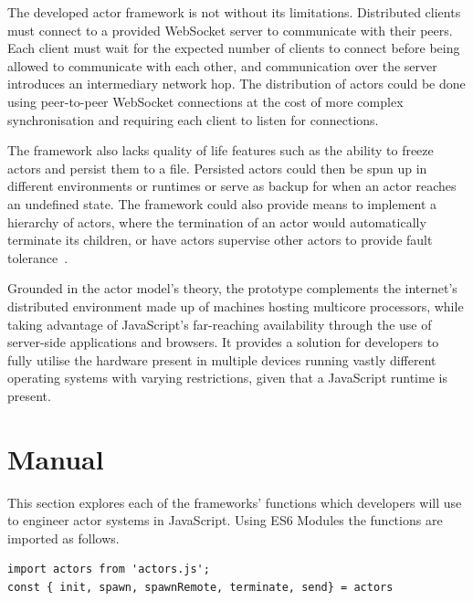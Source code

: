 \documentclass[oneside]{um-fict}
\begin{document}
The developed actor framework is not without its limitations. Distributed clients must connect to a provided WebSocket server to communicate with their peers. Each client must wait for the expected number of clients to connect before being allowed to communicate with each other, and communication over the server introduces an intermediary network hop. The distribution of actors could be done using peer-to-peer WebSocket connections at the cost of more complex synchronisation and requiring each client to listen for connections.

The framework also lacks quality of life features such as the ability to freeze actors and persist them to a file. Persisted actors could then be spun up in different environments or runtimes or serve as backup for when an actor reaches an undefined state. The framework could also provide means to implement a hierarchy of actors, where the termination of an actor would automatically terminate its children, or have actors supervise other actors to provide fault tolerance~\cite{faulttolerance, lebrun}.

Grounded in the actor model's theory, the prototype complements the internet's distributed environment made up of machines hosting multicore processors, while taking advantage of JavaScript's far-reaching availability through the use of server-side applications and browsers. It provides a solution for developers to fully utilise the hardware present in multiple devices running vastly different operating systems with varying restrictions, given that a JavaScript runtime is present.

{%
    \if@openright\cleardoublepage\else\clearpage\fi
    {\scriptsize}
	\printindex
}

\appendix
\chapter{Manual}\label{appendix:manual}
This section explores each of the frameworks' functions which developers will use to engineer actor systems in JavaScript. Using ES6 Modules the functions are imported as follows.
\begin{lstlisting}
import actors from 'actors.js';
const { init, spawn, spawnRemote, terminate, send} = actors
\end{lstlisting}
\end{document}
